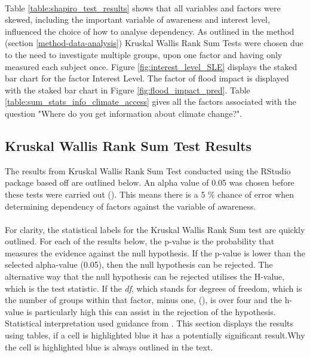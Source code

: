 \paragraph{}


Table \ref{table:shapiro_test_results} shows that all variables and factors were skewed, including the important variable of awareness and interest level, influenced the choice of how to analyse dependency. As outlined in the method (section \ref{method-data-analysis}) Kruskal Wallis Rank Sum Tests were chosen due to the need to investigate multiple groups, upon one factor and having only measured each subject once. Figure \ref{fig:interest_level_SLE} displays the staked bar chart for the factor Interest Level. The factor of flood impact is displayed with the staked bar chart in Figure \ref{fig:flood_impact_pred}. Table \ref{table:sum_stats_info_climate_access} gives all the factors associated with the question "Where do you get information about climate change?".

\subsection{Kruskal Wallis Rank Sum Test Results}
The results from Kruskal Wallis Rank Sum Test conducted using the RStudio package based off \cite{hollander_nonparametric_2014} are outlined below.  An alpha value of 0.05 was chosen before these tests were carried out (\cite{hollander_nonparametric_2014}). This means there is a 5 \% chance of error when determining dependency of factors against the variable of awareness.
\paragraph{}
For clarity, the statistical labels for the Kruskal Wallis Rank Sum test are quickly outlined. For each of the results below, the p-value is the probability that measures the evidence against the null hypothesis.  If the p-value is lower than the selected alpha-value (0.05), then the null hypothesis can be rejected. The alternative way that the null hypothesis can be rejected utilises the H-value, which is the test statistic. If the \textit{df}, which stands for degrees of freedom, which is the number of groups within that factor, minus one, (\cite{minitab_interpret_2022}), is over four and the h-value is particularly high this can assist in the rejection of the hypothesis. Statistical interpretation used guidance from \cite{minitab_interpret_2022}. This section displays the results using tables, if a cell is highlighted blue it has a potentially significant result.Why the cell is highlighted blue is always outlined in the text. 
